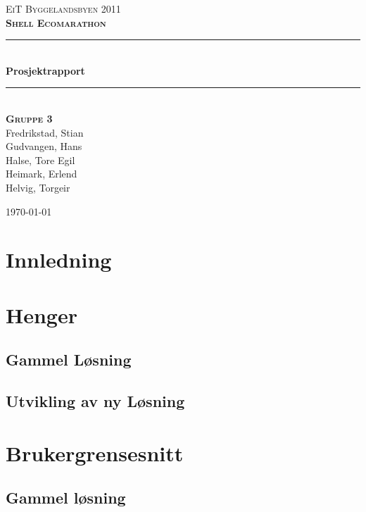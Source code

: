 \documentclass[a4paper,11pt]{report}
\newcommand{\HRule}{\rule{\linewidth}{0.5mm}}
\begin{document}
\begin{titlepage}

\begin{center}
\textsc{\huge EiT Byggelandsbyen 2011}\\
\textsc{\large \bfseries Shell Ecomarathon}\\[1.5cm]

\HRule \\[0.4cm]
{ \huge \bfseries Prosjektrapport}\\[0.4cm]
\HRule \\[1.5cm] 

\textsc{\bfseries Gruppe 3}\\
Fredrikstad, Stian\\
Gudvangen, Hans\\
Halse, Tore Egil\\
Heimark, Erlend\\
Helvig, Torgeir\\

\vfill
 
{\large \today}

\end{center}
\end{titlepage}
\cleardoublepage
{}
\tableofcontents
\listoffigures
\listoftables
\clearpage

\chapter{Innledning}

\chapter{Henger}
\section{Gammel Løsning}

\section{Utvikling av ny Løsning}


\newpage





\chapter{Brukergrensesnitt}
\section{Gammel løsning}

\newpage
\end{document}

